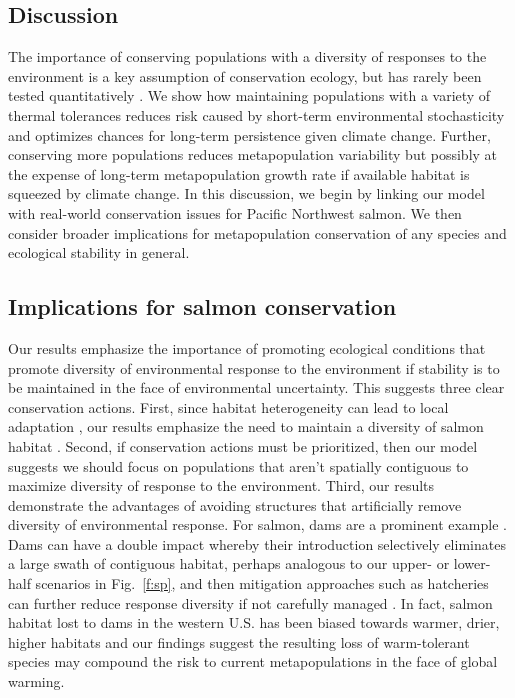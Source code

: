 \documentclass[12pt,english]{article}
\begin{document}
\begin{spacing}{1.9}
\section{Discussion}\label{discussion}

The importance of conserving populations with a diversity of responses to the environment is a key assumption of conservation ecology, but has rarely been tested quantitatively \citep{mori2013}. We show how maintaining populations with a variety of thermal tolerances reduces risk caused by short-term environmental stochasticity and optimizes chances for long-term persistence given climate change. Further, conserving more populations reduces metapopulation variability but possibly at the expense of long-term metapopulation growth rate if available habitat is squeezed by climate change. In this discussion, we begin by linking our model with real-world conservation issues for Pacific Northwest salmon. We then consider broader implications for metapopulation conservation of any species and ecological stability in general.

\subsection{Implications for salmon conservation}\label{implications-for-salmon-conservation}

Our results emphasize the importance of promoting ecological conditions that promote diversity of environmental response to the environment if stability is to be maintained in the face of environmental uncertainty. This suggests three clear conservation actions. First, since habitat heterogeneity can lead to local adaptation \citep[e.g.][]{fraser2011}, our results emphasize the need to maintain a diversity of salmon habitat \citep{rogers2008}. Second, if conservation actions must be prioritized, then our model suggests we should focus on populations that aren't spatially contiguous to maximize diversity of response to the environment. Third, our results demonstrate the advantages of avoiding structures that artificially remove diversity of environmental response. For salmon, dams are a prominent example \citep{mcclure2008a}. Dams can have a double impact whereby their introduction selectively eliminates a large swath of contiguous habitat, perhaps analogous to our upper- or lower-half scenarios in Fig.~\ref{f:sp}, and then mitigation approaches such as hatcheries can further reduce response diversity if not carefully managed \citep{mcclure2008b}. In fact, salmon habitat lost to dams in the western U.S. has been biased towards warmer, drier, higher habitats \citep{mcclure2008a} and our findings suggest the resulting loss of warm-tolerant species may compound the risk to current metapopulations in the face of global warming.


\end{spacing}
\end{document}

